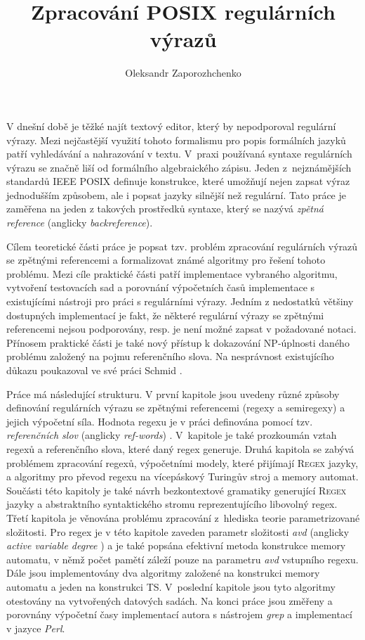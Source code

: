 \documentclass[thesis=B,czech]{FITthesis}[2019/12/23]
\title{Zpracování POSIX regulárních výrazů}
\author{Oleksandr Zaporozhchenko} %
\theoremstyle{definition}
\begin{document}

\begin{introduction}
V dnešní době je těžké najít textový editor, který by nepodporoval regulární výrazy. Mezi nejčastější využití tohoto formalismu pro popis formálních jazyků patří vyhledávání a nahrazování v textu. V~praxi používaná syntaxe regulárních výrazu se značně liší od formálního algebraického zápisu. Jeden z~nejznámějších standardů IEEE POSIX \cite{posix} definuje konstrukce, které umožňují nejen zapsat výraz jednodušším způsobem, ale i popsat jazyky silnější než regulární. Tato práce je zaměřena na jeden z takových prostředků syntaxe, který se nazývá \emph{zpětná reference} (anglicky \emph{backreference}).

Cílem teoretické části práce je popsat tzv. problém zpracování regulárních výrazů se zpětnými referencemi a formalizovat známé algoritmy pro řešení tohoto problému. Mezi cíle praktické části patří implementace vybraného algoritmu, vytvoření testovacích sad a porovnání výpočetních časů implementace s existujícími nástroji pro práci s regulárními výrazy. Jedním z nedostatků většiny dostupných implementací je fakt, že některé regulární výrazy se zpětnými referencemi nejsou podporovány, resp. je není možné zapsat v požadované notaci. Přínosem praktické části je také nový přístup k dokazování NP-úplnosti daného problému založený na pojmu referenčního slova. Na nesprávnost existujícího důkazu \cite[s. 289]{alfred2014algorithms} poukazoval ve své práci Schmid \cite[s. 83]{schmidregex}.

Práce má následující strukturu. V první kapitole jsou uvedeny různé způsoby definování regulárních výrazu se zpětnými referencemi (regexy a semiregexy) a jejich výpočetní síla. Hodnota regexu je v práci definována pomocí tzv. \emph{referenčních slov} (anglicky \emph{ref-words}) \cite{schmidrefwords}. V~kapitole je také prozkoumán vztah regexů a referenčního slova, které daný regex generuje. Druhá kapitola se zabývá problémem zpracování regexů, výpočetními modely, které přijímají \textsc{Regex} jazyky, a algoritmy pro převod regexu na vícepáskový Turingův stroj a memory automat. Součásti této kapitoly je také návrh bezkontextové gramatiky generující \textsc{Regex} jazyky a abstraktního syntaktického stromu reprezentujícího libovolný regex. Třetí kapitola je věnována problému zpracování z~hlediska teorie parametrizované složitosti. Pro regex je v této kapitole zaveden parametr složitosti \emph{avd} (anglicky \emph{active variable degree} \cite{schmidref}) a je také popsána efektivní metoda konstrukce memory automatu, v němž počet pamětí záleží pouze na parametru \emph{avd} vstupního regexu. Dále jsou implementovány dva algoritmy založené na konstrukci memory automatu a jeden na konstrukci TS. V~poslední kapitole jsou tyto algoritmy otestovány na vytvořených datových sadách. Na konci práce jsou změřeny a porovnány výpočetní časy implementací autora s nástrojem \emph{grep} a implementací v jazyce \emph{Perl}. 

\end{introduction}
\end{document}
